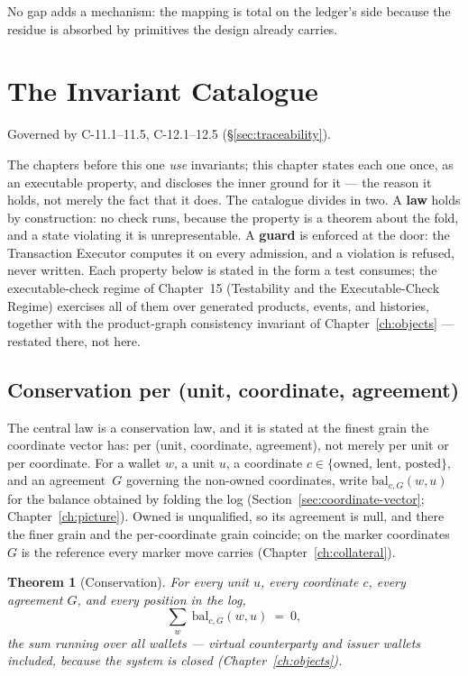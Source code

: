 \documentclass[11pt,a4paper]{article}
\newtheorem{theorem}[definition]{Theorem}
\begin{document}
No gap adds a mechanism: the mapping is total on the ledger's side because the residue is
absorbed by primitives the design already carries.

\section{The Invariant Catalogue}\label{ch:invariants}

Governed by C-11.1--11.5, C-12.1--12.5 (\S\ref{sec:traceability}).

The chapters before this one \emph{use} invariants; this chapter states each one
once, as an executable property, and discloses the inner ground for it --- the
reason it holds, not merely the fact that it does. The catalogue divides in two.
A \textbf{law} holds by construction: no check runs, because the property is a
theorem about the fold, and a state violating it is unrepresentable. A
\textbf{guard} is enforced at the door: the Transaction Executor computes it on
every admission, and a violation is refused, never written. Each property below
is stated in the form a test consumes; the executable-check regime of Chapter~15
(Testability and the Executable-Check Regime) exercises all of them over
generated products, events, and histories, together with the product-graph
consistency invariant of Chapter~\ref{ch:objects} --- restated there, not here.

\subsection{Conservation per (unit, coordinate, agreement)}

The central law is a conservation law, and it is stated at the finest grain the coordinate
vector has: per (unit, coordinate, agreement), not merely per unit or per coordinate. For a
wallet $w$, a unit $u$, a coordinate $c\in\{\text{owned, lent, posted}\}$, and an
agreement~$G$ governing the non-owned coordinates, write $\mathrm{bal}_{c,G}(w,u)$ for the
balance obtained by folding the log (Section~\ref{sec:coordinate-vector};
Chapter~\ref{ch:picture}). Owned is unqualified, so its agreement is null, and there the
finer grain and the per-coordinate grain coincide; on the marker coordinates $G$ is the
reference every marker move carries (Chapter~\ref{ch:collateral}).

\begin{theorem}[Conservation]\label{thm:conservation}
For every unit $u$, every coordinate $c$, every agreement $G$, and every position in the
log,
\[
\sum_{w}\ \mathrm{bal}_{c,G}(w,u)\ =\ 0,
\]
the sum running over all wallets --- virtual counterparty and issuer wallets
included, because the system is closed (Chapter~\ref{ch:objects}).
\end{theorem}
\end{document}
